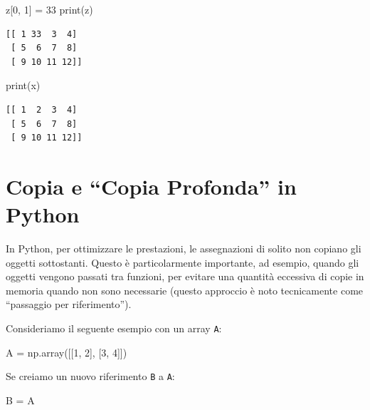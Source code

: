 \documentclass[
  letterpaper,
  krantz2]{{[}./krantz{]}}
\newenvironment{Shaded}{\begin{snugshade}}{\end{snugshade}}
\newcommand{\BuiltInTok}[1]{\textcolor[rgb]{0.00,0.23,0.31}{#1}}
\newcommand{\DecValTok}[1]{\textcolor[rgb]{0.68,0.00,0.00}{#1}}
\newcommand{\NormalTok}[1]{\textcolor[rgb]{0.00,0.23,0.31}{#1}}
\newcommand{\OperatorTok}[1]{\textcolor[rgb]{0.37,0.37,0.37}{#1}}
\begin{document}
\begin{Shaded}
\begin{Highlighting}[]
\NormalTok{z[}\DecValTok{0}\NormalTok{, }\DecValTok{1}\NormalTok{] }\OperatorTok{=} \DecValTok{33}
\BuiltInTok{print}\NormalTok{(z)}
\end{Highlighting}
\end{Shaded}

\begin{verbatim}
[[ 1 33  3  4]
 [ 5  6  7  8]
 [ 9 10 11 12]]
\end{verbatim}

\begin{Shaded}
\begin{Highlighting}[]
\BuiltInTok{print}\NormalTok{(x)}
\end{Highlighting}
\end{Shaded}

\begin{verbatim}
[[ 1  2  3  4]
 [ 5  6  7  8]
 [ 9 10 11 12]]
\end{verbatim}

\section{Copia e ``Copia Profonda'' in
Python}\label{copia-e-copia-profonda-in-python}

In Python, per ottimizzare le prestazioni, le assegnazioni di solito non
copiano gli oggetti sottostanti. Questo è particolarmente importante, ad
esempio, quando gli oggetti vengono passati tra funzioni, per evitare
una quantità eccessiva di copie in memoria quando non sono necessarie
(questo approccio è noto tecnicamente come ``passaggio per
riferimento'').

Consideriamo il seguente esempio con un array \texttt{A}:

\begin{Shaded}
\begin{Highlighting}[]
\NormalTok{A }\OperatorTok{=}\NormalTok{ np.array([[}\DecValTok{1}\NormalTok{, }\DecValTok{2}\NormalTok{], [}\DecValTok{3}\NormalTok{, }\DecValTok{4}\NormalTok{]])}
\end{Highlighting}
\end{Shaded}

Se creiamo un nuovo riferimento \texttt{B} a \texttt{A}:

\begin{Shaded}
\begin{Highlighting}[]
\NormalTok{B }\OperatorTok{=}\NormalTok{ A}
\end{Highlighting}
\end{Shaded}
\end{document}
